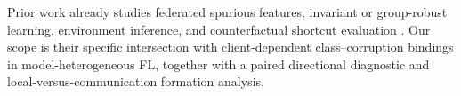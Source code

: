 Prior work already studies federated spurious features, invariant or group-robust learning, environment inference, and counterfactual shortcut evaluation \citep{wang2024pflspurious,tang2024fedpin,ma2024fedcd,creager2021eiil,sagawa2020groupdro,vigneshwaran2026counterfactual}. Our scope is their specific intersection with client-dependent class--corruption bindings in model-heterogeneous FL, together with a paired directional diagnostic and local-versus-communication formation analysis.
